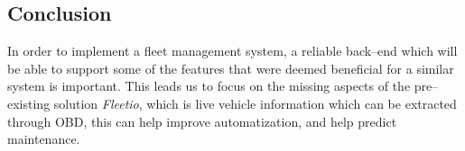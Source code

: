\subsection{Conclusion}\label{sub:Assessment}
In order to implement a fleet management system, a reliable back--end which will be able to support some of the features that were deemed beneficial for a similar system is important.
This leads us to focus on the missing aspects of the pre--existing solution \textit{Fleetio}, which is live vehicle information which can be extracted through \ac{OBD}, this can help improve automatization, and help predict maintenance.
